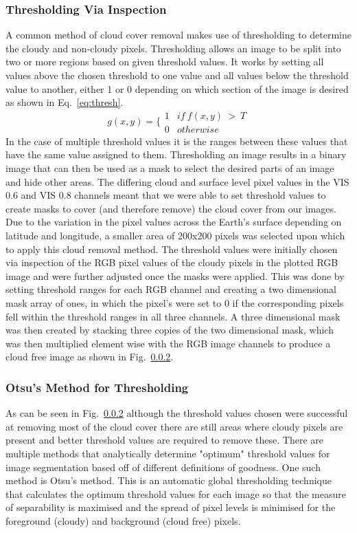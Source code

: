 \subsubsection{Thresholding Via Inspection}
 A common method of cloud cover removal makes use of thresholding to determine the cloudy and non-cloudy pixels. Thresholding allows an image to be split into two or more regions based on given threshold values. It works by setting all values above the chosen threshold to one value and all values below the threshold value to another, either 1 or 0 depending on which section of the image is desired as shown in Eq.~\ref{eq:thresh}.
 \begin{equation}\label{eq:thresh}
     g(x,y)=\Big\{\begin{matrix}
1 & if~f(x,y)~>~ T\\
0 & otherwise
\end{matrix}
 \end{equation}
 In the case of multiple threshold values it is the ranges between these values that have the same value assigned to them. Thresholding an image results in a binary image that can then be used as a mask to select the desired parts of an image and hide other areas. The differing cloud and surface level pixel values in the VIS 0.6 and VIS 0.8 channels meant that we were able to set threshold values to create masks to cover (and therefore remove) the cloud cover from our images. Due to the variation in the pixel values across the Earth's surface depending on latitude and longitude, a smaller area of 200x200 pixels was selected upon which to apply this cloud removal method. The threshold values were initially chosen via inspection of the RGB pixel values of the cloudy pixels in the plotted RGB image and were further adjusted once the masks were applied. This was done by setting threshold ranges for each RGB channel and creating a two dimensional mask array of ones,  in which the pixel's were set to 0 if the corresponding pixels fell within the threshold ranges in all three channels. A three dimensional mask was then created by stacking three copies of the two dimensional mask, which was then multiplied element wise with the RGB image channels to produce a cloud free image as shown in Fig.~\ref{}. 
 
\subsubsection{Otsu's Method for Thresholding}
As can be seen in Fig.~\ref{} although the threshold values chosen were successful at removing most of the cloud cover there are still areas where cloudy pixels are present and better threshold values are required to remove these. There are multiple methods that analytically determine "optimum" threshold values for image segmentation based off of different definitions of goodness. One such method is Otsu's method. This is an automatic global thresholding technique that calculates the optimum threshold values for each image so that the measure of separability is maximised and the spread of pixel levels is minimised for the foreground (cloudy) and background (cloud free) pixels.



